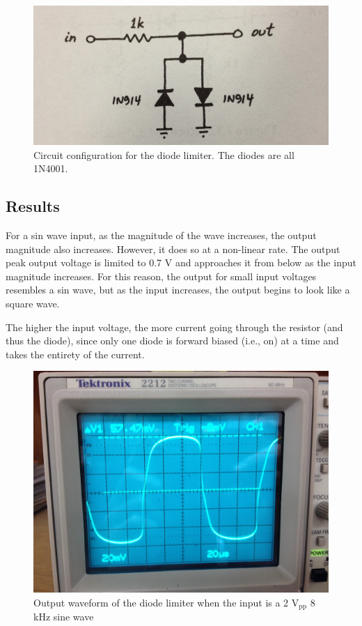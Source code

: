 \documentclass[12pt,letterpaper]{report}
\newlength \figwidth
\begin{document}
\begin{figure}[H]
\centering
\includegraphics[width=\figwidth, keepaspectratio=true]{lab4/circuit_3.jpg}
\caption{Circuit configuration for the diode limiter. The diodes are all 1N4001.}
\label{fig:circuit_3}
\end{figure}

\subsection*{Results}

For a sin wave input, as the magnitude of the wave increases, the output magnitude also increases. However, it does so at a non-linear rate. The output peak output voltage is limited to 0.7 V and approaches it from below as the input magnitude increases. For this reason, the output for small input voltages resembles a sin wave, but as the input increases, the output begins to look like a square wave.

The higher the input voltage, the more current going through the resistor (and thus the diode), since only one diode is forward biased (i.e., on) at a time and takes the entirety of the current.

\begin{figure}[H]
\centering
\includegraphics[width=\figwidth, keepaspectratio=true]{lab4/3_7_1.jpg}
\caption{Output waveform of the diode limiter when the input is a 2 $\text{V}_{\text{pp}}$ 8 kHz sine wave}
\label{fig:3_7_1}
\end{figure}
\end{document}
